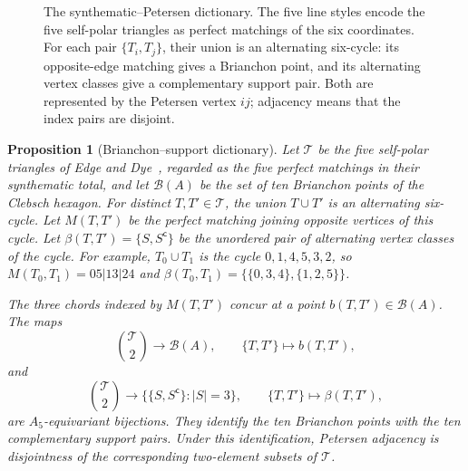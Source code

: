 \documentclass[11pt]{article}
\newtheorem{proposition}[theorem]{Proposition}
\theoremstyle{definition}
\theoremstyle{remark}
\begin{document}
\begin{figure}[H]
\caption{The synthematic--Petersen dictionary. The five line styles encode
the five self-polar triangles as perfect matchings of the six coordinates.
For each pair $\{T_i,T_j\}$, their union is an alternating six-cycle: its
opposite-edge matching gives a Brianchon point, and its alternating vertex
classes give a complementary support pair. Both are represented by the
Petersen vertex $ij$; adjacency means that the index pairs are disjoint.}
\label{fig:synthematic-petersen}
\end{figure}

\begin{proposition}[Brianchon--support dictionary]
\label{prop:brianchon-support}
Let $\mathcal T$ be the five self-polar triangles of Edge and
Dye~\cite{Edge1956,Dye1991}, regarded as the five perfect matchings in
their synthematic total, and let $\mathcal B(A)$ be the set of ten
Brianchon points of the Clebsch hexagon. For distinct $T,T'\in\mathcal T$,
the union $T\cup T'$ is an alternating six-cycle. Let $M(T,T')$ be the
perfect matching joining opposite vertices of this cycle. Let
$\beta(T,T')=\{S,S^{\mathsf c}\}$ be the unordered pair of alternating
vertex classes of the cycle.
For example, $T_0\cup T_1$ is the cycle
$0,1,4,5,3,2$, so $M(T_0,T_1)=05|13|24$ and
$\beta(T_0,T_1)=\{\{0,3,4\},\{1,2,5\}\}$.

The three chords indexed by $M(T,T')$ concur at a point $b(T,T')\in
\mathcal B(A)$. The maps
\[
 \binom{\mathcal T}{2}\longrightarrow\mathcal B(A),
 \qquad \{T,T'\}\longmapsto b(T,T'),
\]
and
\[
 \binom{\mathcal T}{2}\longrightarrow
 \bigl\{\{S,S^{\mathsf c}\}:|S|=3\bigr\},
 \qquad \{T,T'\}\longmapsto\beta(T,T'),
\]
are $A_5$-equivariant bijections. They identify the ten Brianchon points
with the ten complementary support pairs. Under this identification,
Petersen adjacency is disjointness of the corresponding two-element
subsets of $\mathcal T$.
\end{proposition}
\end{document}

